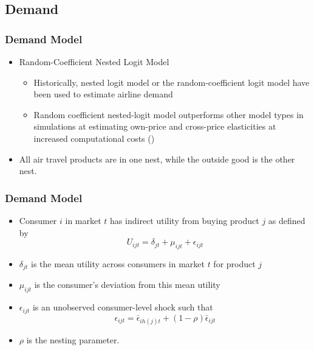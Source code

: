\documentclass[xcolor=dvipsnames]{beamer}
\let\Oldsubsection\subsection
\renewcommand{\subsection}{\FloatBarrier\Oldsubsection}
\begin{document}
    \subsection{Demand}
    \begin{frame}
        \frametitle{Demand Model}
        \begin{itemize}
            \item Random-Coefficient Nested Logit Model 
            \begin{itemize}
                \item Historically, nested logit model or the random-coefficient logit model have been used to estimate airline demand 
                \item Random coefficient nested-logit model outperforms other model types in simulations at estimating own-price and cross-price elasticities at increased computational costs (\cite{grigolon_nested_2014})
            \end{itemize}
            \item All air travel products are in one nest, while the outside good is the other nest. 
        \end{itemize}
    \end{frame}
    
    \begin{frame}
        \frametitle{Demand Model}
        \begin{itemize}
        \item  Consumer $i$ in market $t$ has indirect utility from buying product $j$ as defined by 
\[U_{ijt} = \delta_{jt} + \mu_{ijt} + \epsilon_{ijt}\]
        \item $\delta_{jt}$ is the mean utility across consumers in market $t$ for product $j$
		\item $\mu_{ijt}$ is the consumer's deviation from this mean utility
		\item  $\epsilon_{ijt}$ is an unobserved consumer-level shock such that \[\epsilon_{ijt} = \bar{\epsilon}_{ih(j)t} + (1 - \rho)\bar{\epsilon}_{ijt}\] 

        
		\item $\rho$ is the nesting parameter. 
        \end{itemize}
    \end{frame}
\end{document}
